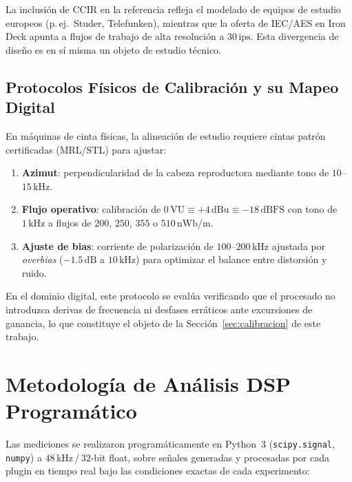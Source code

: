 \documentclass[10pt,conference]{IEEEtran}
\begin{document}
La inclusión de CCIR en la referencia refleja el modelado de equipos de estudio europeos
(p.\,ej.\ Studer, Telefunken), mientras que la oferta de IEC/AES en Iron Deck apunta a
flujos de trabajo de alta resolución a $30\,\text{ips}$. Esta divergencia de diseño es
en sí misma un objeto de estudio técnico.

\subsection{Protocolos Físicos de Calibración y su Mapeo Digital}

En máquinas de cinta físicas, la alineación de estudio requiere cintas patrón certificadas
(MRL/STL) \cite{mrl} para ajustar:
\begin{enumerate}
    \item \textbf{Azimut}: perpendicularidad de la cabeza reproductora mediante tono de
    $10$–$15\,\text{kHz}$.

    \item \textbf{Flujo operativo}: calibración de $0\,\text{VU}\equiv+4\,\text{dBu}
    \equiv -18\,\text{dBFS}$ con tono de $1\,\text{kHz}$ a flujos de $200$, $250$, $355$
    o $510\,\text{nWb/m}$.

    \item \textbf{Ajuste de bias}: corriente de polarización de $100$–$200\,\text{kHz}$
    ajustada por \emph{overbias} ($-1.5\,\text{dB}$ a $10\,\text{kHz}$) para optimizar el
    balance entre distorsión y ruido.
\end{enumerate}

En el dominio digital, este protocolo se evalúa verificando que el procesado no introduzca
derivas de frecuencia ni desfases erráticos ante excursiones de ganancia, lo que constituye
el objeto de la Sección~\ref{sec:calibracion} de este trabajo.

\section{Metodología de Análisis DSP Programático}

Las mediciones se realizaron programáticamente en Python~3 (\texttt{scipy.signal},
\texttt{numpy}) a $48\,\text{kHz}$\,/\,32-bit float, sobre señales generadas y procesadas
por cada plugin en tiempo real bajo las condiciones exactas de cada experimento:
\end{document}
